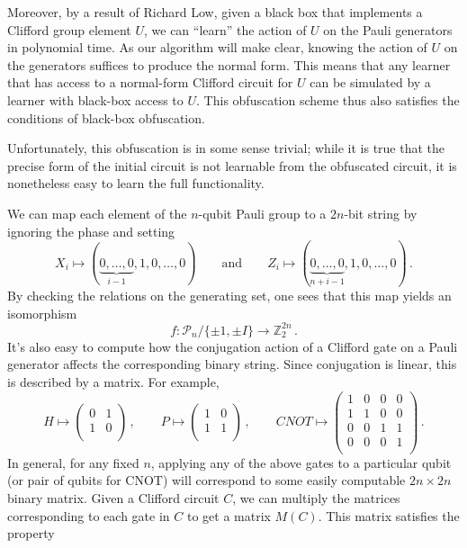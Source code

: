 \documentclass[11pt]{article}
\numberwithin{equation}{section}
\newcommand{\Z}{\mathbb{Z}}
\begin{document}
Moreover, by a result of Richard Low, given a black box that implements a Clifford group element $U$, we can ``learn'' the action of $U$ on the Pauli generators in polynomial time. As our algorithm will make clear, knowing the action of $U$ on the generators suffices to produce the normal form. This means that any learner that has access to a normal-form Clifford circuit for $U$ can be simulated by a learner with black-box access to $U$. This obfuscation scheme thus also satisfies the conditions of black-box obfuscation.

Unfortunately, this obfuscation is in some sense trivial; while it is true that the precise form of the initial circuit is not learnable from the obfuscated circuit, it is nonetheless easy to learn the full functionality.

We can map each element of the $n$-qubit Pauli group to a $2n$-bit string by ignoring the phase and setting
$$
X_i \mapsto (\underbrace{0, \dots, 0}_{i-1}, 1, 0, \dots, 0)
\qquad \text{and} \qquad
Z_i \mapsto (\underbrace{0, \dots, 0}_{n+i-1}, 1, 0, \dots, 0)\,.
$$
By checking the relations on the generating set, one sees that this map yields an isomorphism
$$
f: \mathcal P_n / \{\pm 1, \pm I\} \rightarrow \Z_2^{2n}\,.
$$
It's also easy to compute how the conjugation action of a Clifford gate on a Pauli generator affects the corresponding binary string. Since conjugation is linear, this is described by a matrix. For example,
$$
H \mapsto
\begin{pmatrix}
0 & 1 \\
1 & 0 \\
\end{pmatrix}\,,
\qquad
P \mapsto
\begin{pmatrix}
1 & 0 \\
1 & 1 \\
\end{pmatrix}\,,
\qquad
CNOT \mapsto
\begin{pmatrix}
1 & 0 & 0 & 0\\
1 & 1 & 0 & 0\\
0 & 0 & 1 & 1\\
0 & 0 & 0 & 1\\
\end{pmatrix}\,.
$$
In general, for any fixed $n$, applying any of the above gates to a particular qubit (or pair of qubits for CNOT) will correspond to some easily computable $2n \times 2n$ binary matrix. Given a Clifford circuit $C$, we can multiply the matrices corresponding to each gate in $C$ to get a matrix $M(C)$. This matrix satisfies the property
\end{document}
